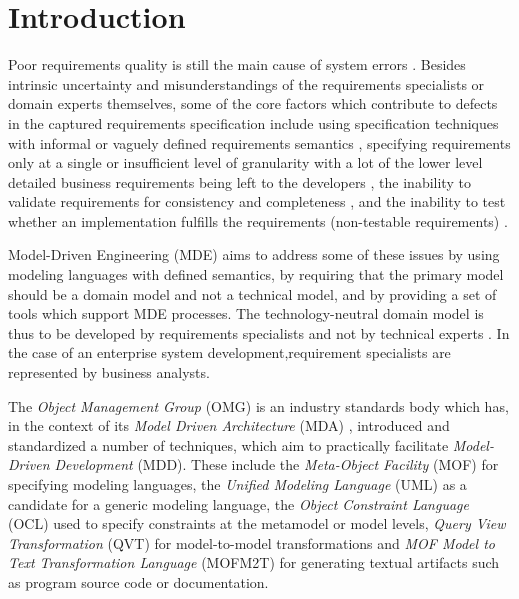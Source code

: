 \section{Introduction}

Poor requirements quality is still the main cause of system errors \cite{heck_experiences_2008}. Besides intrinsic uncertainty and misunderstandings of the requirements specialists or domain experts themselves, some of the core factors which contribute to defects in the captured requirements specification include using specification techniques with informal or vaguely defined requirements semantics \cite{ferguson_empirical_2006}, specifying requirements only at a single or insufficient level of granularity with a lot of the lower level detailed business requirements being left to the developers \cite{espana_evaluating_2009,getBetterReference}, the inability to validate requirements for consistency and completeness \cite{somebodyPleaseFindASuitableReference}, and the inability to test whether an implementation fulfills the requirements (non-testable requirements) \cite{bashardoust-tajali_extracting_2008}.

Model-Driven Engineering (MDE) aims to address some of these issues by using modeling languages with defined semantics, by requiring that the primary model should be a domain model and not a technical model\cite{asnina_computation_2010}, and by providing a set of tools which support MDE processes. The technology-neutral domain model is thus to be developed by requirements specialists and not by technical experts \cite{asnina_computation_2010}. In the case of an enterprise system development,requirement specialists are represented by business analysts.

The {\em Object Management Group} (OMG) is an industry standards body which has, in the context of its {\em Model Driven Architecture} (MDA) \cite{siegel_developing_2001}, introduced and standardized a number of techniques, which aim to practically facilitate {\em Model-Driven Development} (MDD). These include the {\em Meta-Object Facility} (MOF) for specifying modeling languages, the {\em Unified Modeling Language} (UML) as a candidate for a generic modeling language, the {\em Object Constraint Language} (OCL) used to specify constraints at the metamodel or model levels, {\em Query View Transformation} (QVT) for model-to-model transformations and {\em MOF Model to Text Transformation Language} (MOFM2T) for generating textual artifacts such as program source code or documentation. 

